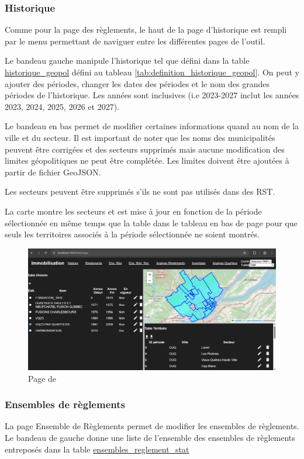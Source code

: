 \subsubsection{Historique}
Comme pour la page des règlements, le haut de la page d'historique est rempli par le menu permettant de naviguer entre les différentes pages de l'outil.\par
Le bandeau gauche manipule l'historique tel que défini dans la table \ul{historique\_geopol} défini au tableau \ref{tab:definition_historique_geopol}. On peut y ajouter des périodes, changer les dates des périodes et le nom des grandes périodes de l'historique. Les années sont inclusives (i.e 2023-2027 inclut les années 2023, 2024, 2025, 2026 et 2027).\par
Le bandeau en bas permet de modifier certaines informations quand au nom de la ville et du secteur. Il est important de noter que les noms des municipalités peuvent être corrigées et des secteurs supprimés mais aucune modification des limites géopolitiques ne peut être complétée. Les limites doivent être ajoutées à partir de fichier GeoJSON.\par
Les secteurs peuvent être supprimés s'ils ne sont pas utilisés dans des \ac{RST}.\par
La carte montre les secteurs et est mise à jour en fonction de la période sélectionnée en même temps que la table dans le tableau en bas de page pour que seuls les territoires associés à la période sélectionnée ne soient montrés.
\begin{landscape}
    \begin{figure}
        \centering
        \includegraphics[width=1\linewidth]{images/PageHistorique.png}
        \caption{Page de}
        \label{fig:page_historique}
    \end{figure}
\end{landscape}
\subsubsection{Ensembles de règlements}
La page Ensemble de Règlements permet de modifier les ensembles de règlements. Le bandeau de gauche donne une liste de l'ensemble des ensembles de règlements entreposés dans la table \ul{ensembles\_reglement\_stat}